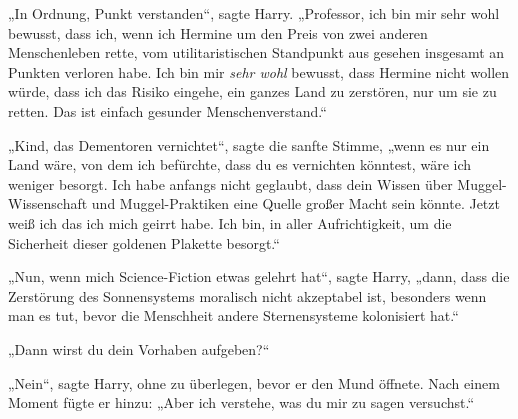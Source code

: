 „In Ordnung, Punkt verstanden“, sagte Harry.
„Professor, ich bin mir sehr wohl bewusst, dass ich, wenn ich Hermine um den Preis von zwei anderen Menschenleben rette, vom utilitaristischen Standpunkt aus gesehen insgesamt an Punkten verloren habe. Ich bin mir \emph{sehr wohl} bewusst, dass Hermine nicht wollen würde, dass ich das Risiko eingehe, ein ganzes Land zu zerstören, nur um sie zu retten. Das ist einfach gesunder Menschenverstand.“

„Kind, das Dementoren vernichtet“, sagte die sanfte Stimme, „wenn es nur ein Land wäre, von dem ich befürchte, dass du es vernichten könntest, wäre ich weniger besorgt. Ich habe anfangs nicht geglaubt, dass dein Wissen über Muggel-Wissenschaft und Muggel-Praktiken eine Quelle großer Macht sein könnte. Jetzt weiß ich das ich mich geirrt habe. Ich bin, in aller Aufrichtigkeit, um die Sicherheit dieser goldenen Plakette besorgt.“

„Nun, wenn mich Science-Fiction etwas gelehrt hat“, sagte Harry, „dann, dass die Zerstörung des Sonnensystems moralisch nicht akzeptabel ist, besonders wenn man es tut, bevor die Menschheit andere Sternensysteme kolonisiert hat.“

„Dann wirst du dein Vorhaben aufgeben?“

„Nein“, sagte Harry, ohne zu überlegen, bevor er den Mund öffnete. Nach einem Moment fügte er hinzu:
„Aber ich verstehe, was du mir zu sagen versuchst.“


